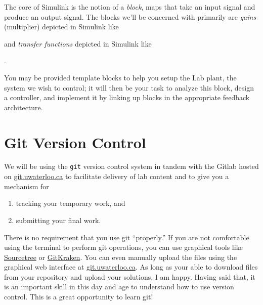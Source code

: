 The core of Simulink is the notion of a \emph{block}, maps that take an input
signal and produce an output signal.
The blocks we'll be concerned with primarily are \emph{gains}
(multiplier) depicted in Simulink like
\begin{center}
\end{center}
and \emph{transfer functions} depicted in Simulink like
\begin{center}
  .
\end{center}
You may be provided template blocks to help you setup the Lab plant, the
system we wish to control; it will then be your task to analyze this block,
design a controller, and implement it by linking up blocks
in the appropriate feedback architecture.

\section{Git Version Control}
We will be using the \texttt{git} version control system in tandem with
the Gitlab hosted on \url{git.uwaterloo.ca} to facilitate delivery of lab
content and to give you a mechanism for
\begin{enumerate}[label=(\arabic*)]
  \item{tracking your temporary work, and}
  \item{submitting your final work.}
\end{enumerate}
There is no requirement that you use git ``properly.'' If you are not
comfortable using the terminal to perform git operations, you can use graphical
tools like \href{https://www.sourcetreeapp.com/}{Sourcetree} or
\href{https://www.gitkraken.com/git-client}{GitKraken}. You can even manually
upload the files using the graphical web interface at \url{git.uwaterloo.ca}.
As long as your able to download files from your repository and upload your
solutions, I am happy. Having said that, it is an important skill in this
day and age to understand how to use version control. This is a
great opportunity to learn git!


